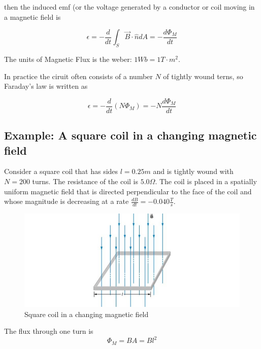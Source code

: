 \documentclass[14pt]{memoir}
\begin{document}
then the induced emf (or the voltage generated by a conductor or coil moving in a magnetic field is

\begin{equation}
\epsilon = -\frac{d}{dt} \int_S \vec{B} \cdot \hat{n} dA = -\frac{d \Phi_M} {dt}
\end{equation}

The units of Magnetic Flux is the  weber: $ 1 Wb = 1 T \cdot m^2$.

In practice the ciruit often consists of a number $N$ of tightly wound terns, so Faraday's law is written as 

\begin{equation}
\epsilon = -\frac{d}{dt} (N \Phi_M)  = -N\frac{d \Phi_M} {dt}
\end{equation}

\subsection{Example: A square coil in a changing magnetic field}

Consider a square coil that has sides $l = 0.25m$ and is tightly wound with $N = 200$ turns. The resistance of the coil is $5.0 \Omega$. The coil is placed in a spatially uniform magnetic field that is directed perpendicular to the face of the coil and whose magnitude is decreasing at a rate $\frac{dB}{dt} = -0.040 \frac{T}{s}$. 

\begin{figure}[H]
\begin{center}
\includegraphics[scale=0.5]{fig/fig_13_06.jpg}
\caption{Square coil in a changing magnetic field}
\label{fig:13_06}
\end{center}
\end{figure}

The flux through one turn is 
\begin{equation}
\Phi_M = BA = Bl^2
\end{equation}
\end{document}
